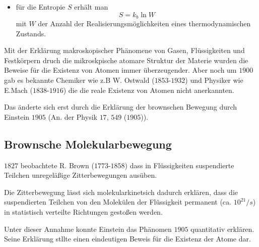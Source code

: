 \begin{itemize}
    \item für die Entropie $S$ erhält man  
    \begin{equation*}
        S = k_b \ln W  
    \end{equation*}
    mit $W$ der Anzahl der Realisierungsmöglichkeiten eines thermodynamischen
    Zustands.
\end{itemize}

Mit der Erklärung makroskopischer Phänomene von Gasen, Flüssigkeiten und
Festkörpern druch die mikroskpische atomare Struktur der Materie wurden die
Beweise für die Existenz von Atomen immer überzeugender. Aber noch um $1900$
gab es bekannte Chemiker wie z.B W. Ostwald ($1853$-$1932$) und Physiker wie
E.Mach ($1838$-$1916$) die die reale Existenz von Atomen nicht anerkannten.

Das änderte sich erst durch die Erklärung der brownschen Bewegung durch
Einstein $1905$ (An. der Physik $17$, $549$ ($1905$)).

\subsection{Brownsche Molekularbewegung} %
\label{sub:Brownsche_Molejularbewegung}
$1827$ beobachtete R. Brown ($1773$-$1858$) dass in Flüssigkeiten suspendierte
Teilchen unregeläßige Zitterbewegungen ausüben.

Die Zitterbewegung lässt sich molekularkinetsich dadurch erklären, dass die
suspendierten  Teilchen von den Molekülen der Flüssigkeit permanent (ca.
$10^{21} / s$) in statistisch verteilte Richtungen gestoßen werden.

Unter dieser Annahme konnte Einstein das Phänomen $1905$ quantitativ erklären.
Seine Erklärung stllte einen eindeutigen Beweis für die Existenz der Atome dar.

